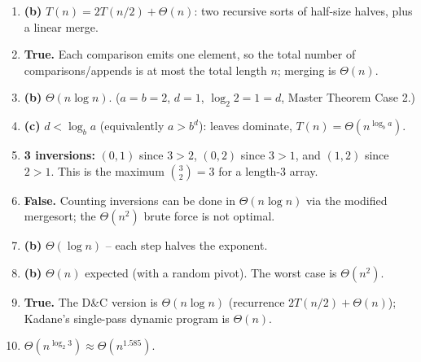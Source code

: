 \documentclass[11pt]{article}
\begin{document}
\begin{enumerate}[label=\textbf{B\arabic*.}, leftmargin=2.2em]

\item \textbf{(b)} $T(n) = 2T(n/2) + \Theta(n)$: two recursive sorts of half-size halves,
plus a linear merge.

\item \textbf{True.} Each comparison emits one element, so the total number of
comparisons/appends is at most the total length $n$; merging is $\Theta(n)$.

\item \textbf{(b)} $\Theta(n \log n)$. ($a=b=2$, $d=1$, $\log_2 2 = 1 = d$, Master Theorem
Case 2.)

\item \textbf{(c)} $d < \log_b a$ (equivalently $a > b^d$): leaves dominate, $T(n) =
\Theta(n^{\log_b a})$.

\item \textbf{3 inversions:} $(0,1)$ since $3>2$, $(0,2)$ since $3>1$, and $(1,2)$ since
$2>1$. This is the maximum $\binom{3}{2} = 3$ for a length-3 array.

\item \textbf{False.} Counting inversions can be done in $\Theta(n \log n)$ via the modified
mergesort; the $\Theta(n^2)$ brute force is not optimal.

\item \textbf{(b)} $\Theta(\log n)$ -- each step halves the exponent.

\item \textbf{(b)} $\Theta(n)$ expected (with a random pivot). The worst case is
$\Theta(n^2)$.

\item \textbf{True.} The D\&C version is $\Theta(n \log n)$ (recurrence $2T(n/2) +
\Theta(n)$); Kadane's single-pass dynamic program is $\Theta(n)$.

\item $\Theta(n^{\log_2 3}) \approx \Theta(n^{1.585})$.

\end{enumerate}
\end{document}
